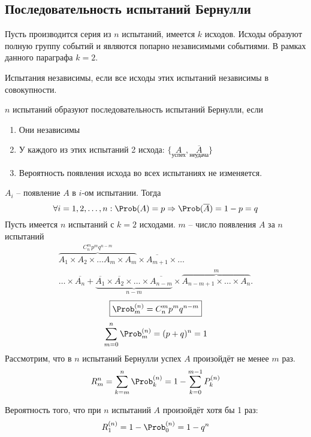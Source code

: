 \subsection{Последовательность испытаний Бернулли}
Пусть производится серия из $n$ испытаний, имеется $k$ исходов. Исходы образуют полную группу событий и являются попарно независимыми событиями. В рамках данного параграфа $k = 2$.
\begin{definition}
  Испытания независимы, если все исходы этих испытаний независимы в совокупности.
\end{definition}
\begin{definition}
  $n$ испытаний образуют последовательность испытаний Бернулли, если
  \begin{enumerate}
    \item Они независимы
    \item У каждого из этих испытаний 2 исхода: $\{\underset{\text{успех}}{A}, \underset{\text{неудача}}{\overline{A}} \}$
    \item Вероятность появления исхода во всех испытаниях не изменяется.
  \end{enumerate}
\end{definition}
$A_i$ -- появление $A$ в $i$-ом испытании. Тогда
\[ \forall i=\To n : \Prob(A) = p \Rightarrow \Prob(\overline{A}) = 1 - p = q \]
Пусть имеется $n$ испытаний с $k=2$ исходами. $m$ -- число появления $A$ за $n$ испытаний
\[
  \begin{split}
  \overbrace{A_1 \times A_2 \times \dots A_m \times A_m}^{C_n^m p^m q^{n-m}} \times \overline{A_{m+1}} \times \dots \\
  \ldots \times \overline{A_n} + \underbrace{\overline{A_1} \times \overline{A_2} \times \dots \times \overline{A_{n-m}}}_{n-m} \times \overbrace{A_{n-m+1} \times \ldots \times A_n}^m.
  \end{split}
\]
\[
  \boxed{\Prob_m^{(n)} = C_n^m p^m q^{n-m}}
\]
\[
  \sum\limits_{m=0}^n \Prob_m^{(n)} = (p + q)^n = 1
\]
Рассмотрим, что в $n$ испытаний Бернулли успех $A$ произойдёт не менее $m$ раз.
\[
  R_m^{n} = \sum\limits_{k = m}^n \Prob_k^{(n)} = 1 - \sum\limits_{k=0}^{m-1} P_k^{(n)}
\]
\begin{example}
  Вероятность того, что при $n$ испытаний $A$ произойдёт хотя бы 1 раз:
  \[ R_1^{(n)} = 1 - \Prob_0^{(n)} = 1 - q^n \]
\end{example}
